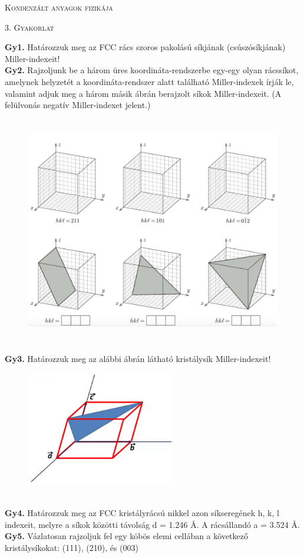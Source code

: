 \documentclass[12pt]{article}
\begin{document}
\centerline{
\textsc{\Large{ Kondenzált anyagok fizikája}}
}
\centerline{ 
\textsc{\large{3. Gyakorlat}}
}
\vspace{10mm}

\textbf{Gy1.} Határozzuk meg az FCC rács szoros pakolású síkjának (csúszósíkjának) Miller-indexeit!
\\

\textbf{Gy2.} Rajzoljunk be a három üres koordináta-rendszerbe egy-egy olyan rácssíkot, amelynek helyzetét a koordináta-rendszer alatt található Miller-indexek írják le, valamint adjuk meg a három másik ábrán berajzolt síkok Miller-indexeit. (A felülvonás negatív Miller-indexet jelent.)
\begin{figure}[h!]
\begin{center}
\includegraphics[height=10cm]{../images/kristalysikok.png} 
\end{center}
\end{figure}

\textbf{Gy3.} Határozzuk meg az alábbi ábrán látható kristálysík Miller-indexeit!
\begin{figure}[h!]
\begin{center}
\includegraphics[height=5cm]{../images/ferdeszogu-11m1.png} 
\end{center}
\end{figure}
\\

\textbf{Gy4.} Határozzuk meg az FCC kristályrácsú nikkel azon síkseregének h, k, l indexeit, melyre a síkok közötti távolság d = 1.246 Å. A rácsállandó a = 3.524 Å.
\\

\textbf{Gy5.} Vázlatosan rajzoljuk fel egy köbös elemi cellában a következő kristálysíkokat: (111), (210),
és (003)
\end{document}
